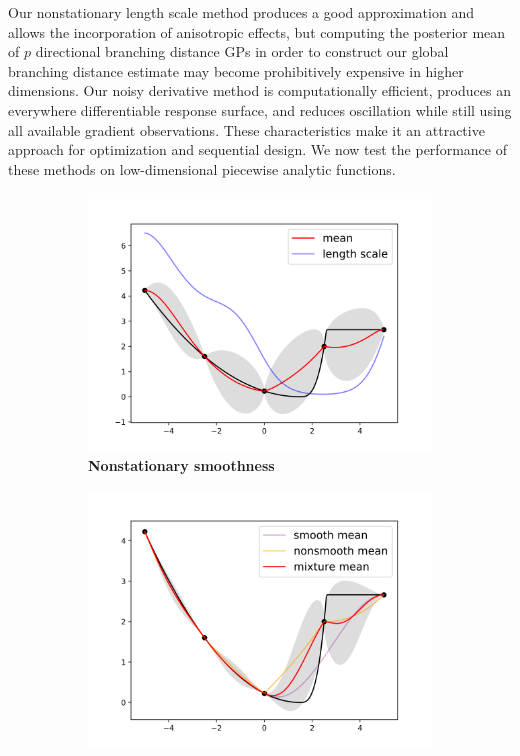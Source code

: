 \documentclass{article}
\begin{document}
Our nonstationary length scale method produces a good approximation and allows the incorporation of anisotropic effects, but computing the posterior mean of $p$ directional branching distance GPs in order to construct our global branching distance estimate may become prohibitively expensive in higher dimensions. Our noisy derivative method is computationally efficient, produces an everywhere differentiable response surface, and reduces oscillation while still using all available gradient observations. These characteristics make it an attractive approach for optimization and sequential design. We now test the performance of these methods on low-dimensional piecewise analytic functions.

\begin{figure}
		\centering
		\captionsetup{justification=centering}
    \begin{subfigure}[b]{.4\textwidth}
      \centering
      \includegraphics[scale=0.35]{figures/kink-smoothness.png}
      \caption{\textbf{Nonstationary smoothness}}
    \end{subfigure}%
    \begin{subfigure}[b]{.4\textwidth}
      \centering
      \includegraphics[scale=0.35]{figures/kink-mixture.png}

\end{subfigure}
\end{figure}
\end{document}
